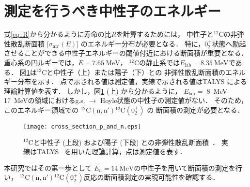 \documentclass[../master]{subfiles}
\begin{document}
\section{測定を行うべき中性子のエネルギー}
式\eqref{eq::R}から分かるように寿命の比$R$を計算するためには，
中性子と${}^{12}\mathrm{C}$の非弾性散乱断面積 [$\sigma_\mathrm{nn'} (E)$] のエネルギー分布が必要となる．
特に，$0_2^+$状態へ励起させることができる中性子エネルギーの閾値付近における断面積が重要となる．
重心系の円ルギーでは，$E=\SI{7.65}{\mega\electronvolt}$，
${}^{12}\mathrm{C}$の静止系では$E_{\text{lab}} = \SI{8.35}{\mega\electronvolt}$である．
図\ref{fig::crosssection_pres}は${}^{12}\mathrm{C}$と中性子（上）または陽子（下）との
非弾性散乱断面積のエネルギー分布を示す．
点で示される値は測定値，実線で示される値はTALYS による理論計算値を表す．
しかし，図\ref{fig::crosssection_pres} (上) から分かるように，
$E_{\text{lab}} =$ \SIrange{8}{17}{\mega\electronvolt}の領域におけるg.s. $\rightarrow$ Hoyle状態の中性子の測定値がない．
そのため，このエネルギー領域での ${}^{12}\mathrm{C}(\mathrm{n},\mathrm{n}'){}^{12}\mathrm{C} (0_2^+)$ の
断面積の測定が必要となる．
\begin{figure}
  \centering
  \texttt{[image: cross\_section\_p\_and\_n.eps]}
  \caption[${}^{12}\mathrm{C}$と中性子 (上段) および陽子 (下段) との非弾性散乱断面積．]
          {${}^{12}\mathrm{C}$と中性子 (上段) および陽子 (下段) との非弾性散乱断面積~\cite{hotdensemedium}．
  実線はTALYS~\cite{talys-1.0} を用いた理論計算，点は測定値を表す．}
  \label{fig::crosssection_pres}
\end{figure}
本研究ではその第一歩として
$E_{\text{n}} = \SI{14}{\mega\electronvolt}$の中性子を用いて断面積の測定を行い，
${}^{12}\mathrm{C}(\mathrm{n},\mathrm{n}'){}^{12}\mathrm{C} (0_2^+)$反応の断面積測定の実現可能性を確認する．
\end{document}
